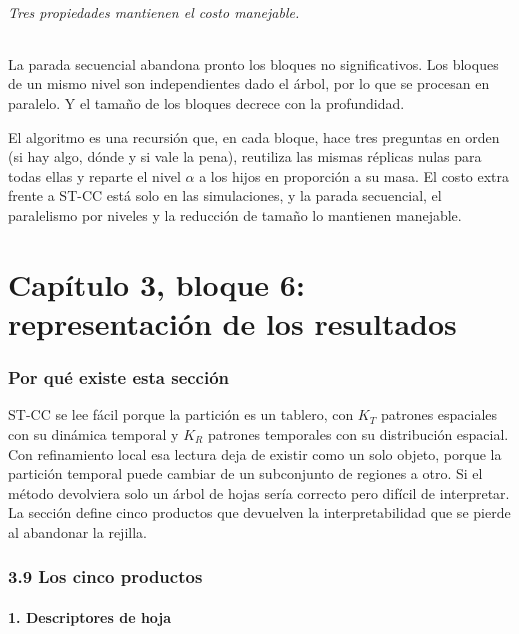 \documentclass[11pt,a4paper]{article}
\newenvironment{idea}{\par\begin{center}\begin{lrbox}{\ideabox}\begin{minipage}{0.9\linewidth}}{\end{minipage}\end{lrbox}\fcolorbox{blue!40!black}{blue!5}{\usebox{\ideabox}}\end{center}}
\begin{document}
\paragraph{Tres propiedades mantienen el costo manejable.} La parada secuencial
abandona pronto los bloques no significativos. Los bloques de un mismo nivel son
independientes dado el árbol, por lo que se procesan en paralelo. Y el tamaño de los
bloques decrece con la profundidad.

\begin{idea}
El algoritmo es una recursión que, en cada bloque, hace tres preguntas en orden (si
hay algo, dónde y si vale la pena), reutiliza las mismas réplicas nulas para todas
ellas y reparte el nivel $\alpha$ a los hijos en proporción a su masa. El costo extra
frente a ST-CC está solo en las simulaciones, y la parada secuencial, el
paralelismo por niveles y la reducción de tamaño lo mantienen manejable.
\end{idea}

\part{Capítulo 3, bloque 6: representación de los resultados}

\section{Por qué existe esta sección}

ST-CC se lee fácil porque la partición es un tablero, con $K_T$ patrones espaciales
con su dinámica temporal y $K_R$ patrones temporales con su distribución espacial.
Con refinamiento local esa lectura deja de existir como un solo objeto, porque la
partición temporal puede cambiar de un subconjunto de regiones a otro. Si el método
devolviera solo un árbol de hojas sería correcto pero difícil de interpretar. La
sección define cinco productos que devuelven la interpretabilidad que se pierde al
abandonar la rejilla.

\section{3.9 Los cinco productos}

\subsection{1. Descriptores de hoja}
\end{document}
